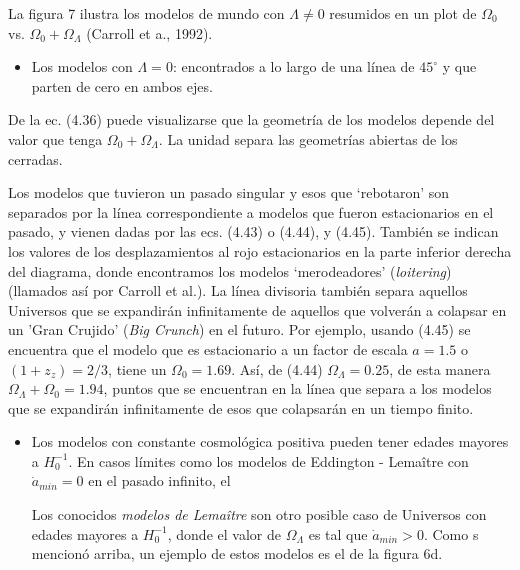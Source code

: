\documentclass[11pt]{article}
\begin{document}
    La figura 7 ilustra los modelos de mundo con $\Lambda \neq 0$  resumidos en un plot de $\Omega_0$  vs. $\Omega_0 + \Omega_{\Lambda}$ (Carroll et a., 1992). 
    
    \begin{itemize}
        \item Los modelos con $\Lambda=0$: encontrados a lo largo de una línea de $45^{\circ}$ y que parten de cero en ambos ejes. 
    \end{itemize}
    
    De la ec. (4.36) puede visualizarse que la geometría de los modelos depende del valor que tenga $\Omega_0 +  \Omega_{\Lambda}$. La unidad separa las geometrías abiertas de los cerradas. 
    
    Los modelos que tuvieron un pasado singular y esos que `rebotaron' son separados por la línea correspondiente a modelos que fueron estacionarios en el pasado, y vienen dadas por las ecs. (4.43) o (4.44), y (4.45). También se indican los valores de los desplazamientos al rojo estacionarios en la parte inferior derecha del diagrama, donde encontramos los modelos `merodeadores' ({\textit{loitering}}) (llamados así por Carroll et al.). La línea divisoria también separa aquellos Universos que se expandirán infinitamente de aquellos que volverán a colapsar en un 'Gran Crujido' ({\textit{Big Crunch}}) en el futuro. Por ejemplo, usando (4.45) se encuentra que el modelo que es estacionario a un factor de escala $a=1.5$ o $(1+z_z)=2/3$, tiene un $\Omega_0=1.69$. Así, de (4.44) $\Omega_{\Lambda} =0.25$, de esta manera $\Omega_{\Lambda} + \Omega_0 = 1.94$, puntos que se encuentran en la línea que separa a los modelos que se expandirán infinitamente de esos que colapsarán en un tiempo finito. 
    
    
    \begin{itemize}
        \item Los modelos con constante cosmológica positiva pueden tener edades mayores a $H_0^{-1}$. En casos límites como los modelos de Eddington - Lema\^itre con $\dot{a}_{min}=0$ en el pasado infinito, el 
        
       Los conocidos {\textit{modelos de Lema\^itre}} son otro posible caso de Universos con edades mayores a $H_0^{-1}$, donde el valor de $\Omega_{\Lambda}$ es tal que $\dot{a}_{min} >0$. Como s mencionó arriba, un ejemplo de estos modelos es el de la figura 6d. 
    \end{itemize}
    
\end{document}
